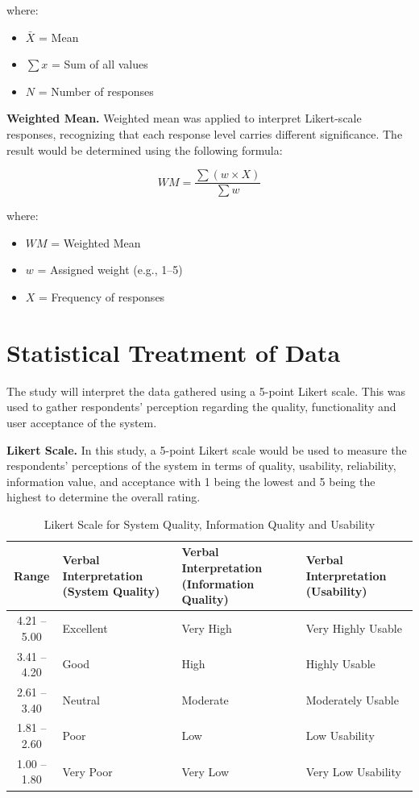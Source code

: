 \documentclass{research}
\begin{document}
\noindent where:
\begin{itemize}
    \item $\bar{X}$ = Mean
    \item $\sum x$ = Sum of all values
    \item $N$ = Number of responses
\end{itemize}

\textbf{Weighted Mean.} Weighted mean was applied to interpret Likert-scale responses, recognizing that each response level carries different significance. The result would be determined using the following formula:

\begin{equation}
    WM = \frac{\sum (w \times X)}{\sum w}
\end{equation}

\noindent where:
\begin{itemize}
    \item $WM$ = Weighted Mean
    \item $w$ = Assigned weight (e.g., 1--5)
    \item $X$ = Frequency of responses
\end{itemize}

\section{Statistical Treatment of Data}

The study will interpret the data gathered using a 5-point Likert scale. This was used to gather respondents' perception regarding the quality, functionality and user acceptance of the system.

\textbf{Likert Scale.} In this study, a 5-point Likert scale would be used to measure the respondents' perceptions of the system in terms of quality, usability, reliability, information value, and acceptance with 1 being the lowest and 5 being the highest to determine the overall rating.

\begin{table}[htbp]
\centering
\caption{Likert Scale for System Quality, Information Quality and Usability}
\label{tab:likert1}
\begin{tabularx}{\textwidth}{c|X|X|X}
\hline
\textbf{Range} & \textbf{Verbal Interpretation (System Quality)} & \textbf{Verbal Interpretation (Information Quality)} & \textbf{Verbal Interpretation (Usability)} \\
\hline
4.21 -- 5.00 & Excellent     & Very High  & Very Highly Usable \\
\hline
3.41 -- 4.20 & Good          & High       & Highly Usable      \\
\hline
2.61 -- 3.40 & Neutral       & Moderate   & Moderately Usable  \\
\hline
1.81 -- 2.60 & Poor          & Low        & Low Usability      \\
\hline
1.00 -- 1.80 & Very Poor     & Very Low   & Very Low Usability \\
\hline
\end{tabularx}
\end{table}
\end{document}
